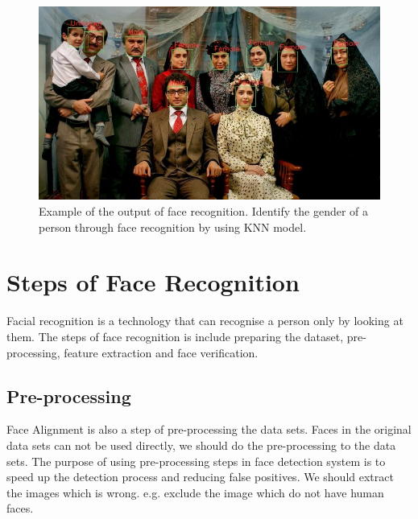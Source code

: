 \documentclass[10pt,twocolumn,letterpaper]{article}
\begin{document}
\begin{figure}[htp]
  \centering
   \includegraphics[width=0.9\linewidth]{image.jpeg}

   \caption{Example of the output of face recognition. Identify the gender of a person through face recognition by using KNN model. ~\cite{github}}
\end{figure}




\section{Steps of Face Recognition}
\label{steps info}

Facial recognition is a technology that can recognise a person only by looking at them.
The steps of face recognition is include preparing the dataset, pre-processing, feature extraction and face verification. 




\subsection{Pre-processing}
Face Alignment is also a step of pre-processing the data sets.
Faces in the original data sets can not be used directly, we should do the pre-processing to the data sets.
The purpose of using pre-processing steps in face detection system is to speed up the detection process and reducing false positives.
We should extract the images which is wrong. e.g. exclude the image which do not have human faces.
\end{document}
